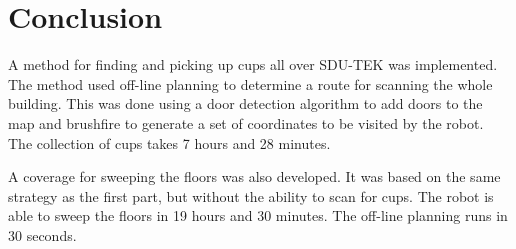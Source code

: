 \section{Conclusion}
\label{sec:conclusion}
A method for finding and picking up cups all over SDU-TEK was implemented. The method used off-line planning to determine a route for scanning the whole building. 
This was done using a door detection algorithm to add doors to the map and brushfire to generate a set of coordinates to be visited by the robot.
The collection of cups takes 7 hours and 28 minutes.

A coverage for sweeping the floors was also developed. It was based on the same strategy as the first part, but without the ability to scan for cups. The robot is able to sweep the floors in 19 hours and 30 minutes. The off-line planning runs in 30 seconds. 



